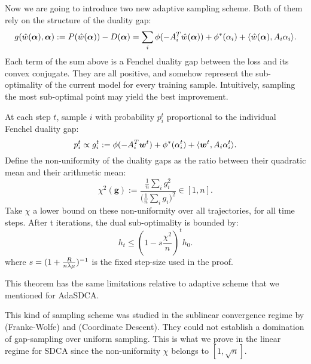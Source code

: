 \begin{subappendices}
Now we are going to introduce two new adaptive sampling scheme.
Both of them rely on the structure of the duality gap:
\begin{equation}
	g(\hat w(\boldsymbol{\alpha}),\boldsymbol{\alpha}) := P(\hat w(\boldsymbol{\alpha})) - D(\boldsymbol{\alpha}) = \sum_i \phi(-A_i^T \hat w(\boldsymbol{\alpha})) + \phi^*(\alpha_i) + \langle \hat w(\boldsymbol{\alpha}),  A_i \alpha_i \rangle.
\end{equation}
Each term of the sum above is a Fenchel duality gap between the loss and its convex conjugate.
They are all positive, and somehow represent the sub-optimality of the current model for every training sample.
Intuitively, sampling the most sub-optimal point may yield the best improvement.

\begin{theorem}
	\label{app:th:gap}
	At each step $t$, sample $i$ with probability $p_i^t$ proportional to the individual Fenchel duality gap:
	\begin{equation}
		p_i^t \propto g_i^t := \phi(-A_i^T \boldsymbol{w}^t) + \phi^*(\alpha_i^t) + \langle \boldsymbol{w}^t,  A_i \alpha_i^t \rangle.
	\end{equation}
	Define the non-uniformity of the duality gaps as the ratio between their quadratic mean and their arithmetic mean:
	\begin{equation}
	    \label{app:eq:non-uniformity}
		\chi^2(\bm g) := \frac{\frac{1}{n} \sum_i g_i^2}{  \big ( \frac{1}{n}  \sum_i g_i \big )^2 } \in [1,n].
	\end{equation}
	Take $\chi$ a lower bound on these non-uniformity over all trajectories, for all time steps.
	After t iterations, the dual sub-optimality is bounded by:
	\begin{equation}
		h_t \leq (1-s\frac{\chi^2}{n})^t  h_0.
	\end{equation}
	where $ s = (1+ \frac{R}{n \lambda \mu} )^{-1} $ is the fixed step-size used in the proof.
\end{theorem}

This theorem has the same limitations relative to adaptive scheme that we mentioned for AdaSDCA.

This kind of sampling scheme was studied in the sublinear convergence regime by \citet{osokin2016minding} (Franke-Wolfe) and \citet{perekrestenko17a} (Coordinate Descent).
They could not establish a domination of gap-sampling over uniform sampling.
This is what we prove in the linear regime for SDCA since the non-uniformity $\chi$ belongs to $[1,\sqrt n]$.


\end{subappendices}
